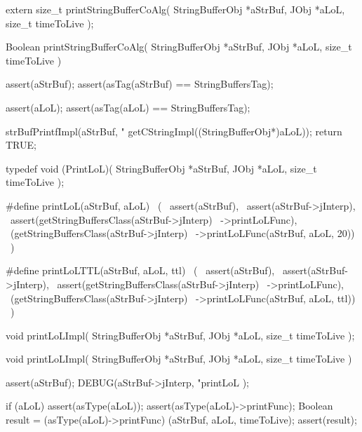 
\startCHeader
extern size_t printStringBufferCoAlg(
  StringBufferObj *aStrBuf,
  JObj            *aLoL,
  size_t           timeToLive
);
\stopCHeader
{}

\startCCode
Boolean printStringBufferCoAlg(
  StringBufferObj *aStrBuf,
  JObj            *aLoL,
  size_t           timeToLive
) {
  assert(aStrBuf);
  assert(asTag(aStrBuf) == StringBuffersTag);
  
  assert(aLoL);
  assert(asTag(aLoL) == StringBuffersTag);

  strBufPrintfImpl(aStrBuf, "%
    getCStringImpl((StringBufferObj*)aLoL));
  return TRUE;
}
\stopCCode

\startCHeader
typedef void (PrintLoL)(
  StringBufferObj *aStrBuf,
  JObj            *aLoL,
  size_t           timeToLive
);

#define printLoL(aStrBuf, aLoL)                     \
  (                                                 \
    assert(aStrBuf),                                \
    assert(aStrBuf->jInterp),                       \
    assert(getStringBuffersClass(aStrBuf->jInterp)  \
      ->printLoLFunc),                              \
    (getStringBuffersClass(aStrBuf->jInterp)        \
      ->printLoLFunc(aStrBuf, aLoL, 20))            \
  )

#define printLoLTTL(aStrBuf, aLoL, ttl)             \
  (                                                 \
    assert(aStrBuf),                                \
    assert(aStrBuf->jInterp),                       \
    assert(getStringBuffersClass(aStrBuf->jInterp)  \
      ->printLoLFunc),                              \
    (getStringBuffersClass(aStrBuf->jInterp)        \
      ->printLoLFunc(aStrBuf, aLoL, ttl))           \
  )
\stopCHeader

\setCHeaderStream{private}
\startCHeader
void printLoLImpl(
  StringBufferObj *aStrBuf,
  JObj            *aLoL,
  size_t           timeToLive
);
\stopCHeader
\setCHeaderStream{public}

\startCCode
void printLoLImpl(
  StringBufferObj *aStrBuf,
  JObj            *aLoL,
  size_t           timeToLive
) {
  assert(aStrBuf);
  DEBUG(aStrBuf->jInterp,
    "printLoL %
  );

  if (aLoL) {
    assert(asType(aLoL));
    assert(asType(aLoL)->printFunc);
    Boolean result =
      (asType(aLoL)->printFunc)
        (aStrBuf, aLoL, timeToLive);
    assert(result);
  }
}
\stopCCode
{}

